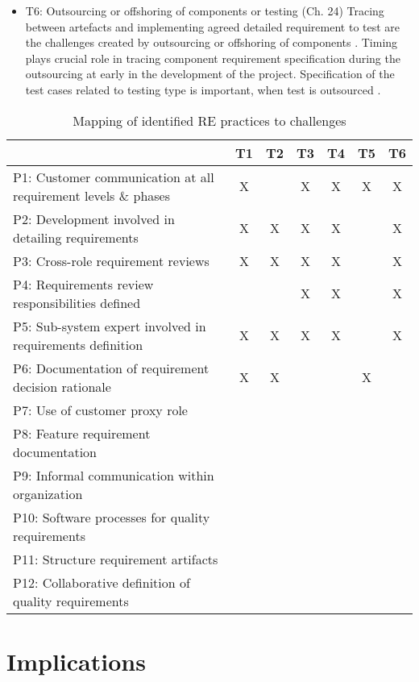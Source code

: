 \documentclass{article}
\begin{document}
\begin{itemize}
\item  T6: Outsourcing or offshoring of components or testing (Ch. 24)
Tracing between artefacts and implementing agreed detailed requirement to test are the challenges created by outsourcing or offshoring of components \cite{bjarnason2014challengesS9}. Timing plays crucial role in tracing component requirement specification during the outsourcing at early in the development of the project. Specification of the test cases related to testing type is important, when test is outsourced \cite{bjarnason2014challengesS9}.

\end{itemize}


\begin{table}[]
    \centering
    \begin{tabular}{p{6cm}|c|c|c|c|c|c}
         &  T1 & T2 & T3 & T4 & T5 & T6 \\
         \hline
        P1: Customer communication at all requirement levels \& phases & X & & X & X & X & X \\
        P2: Development involved in detailing requirements & X & X & X & X & & X \\
        P3: Cross-role requirement reviews & X & X & X & X & & X \\
        P4: Requirements review responsibilities defined  &  &  &  X & X &  &  X \\
        P5: Sub-system expert involved in requirements definition & X & X & X & X &  & X \\
        P6: Documentation of requirement decision rationale & X & X &  &  &  X &   \\
        P7: Use of customer proxy role & & & & & & \\
        P8: Feature requirement documentation & & & & & & \\
        P9: Informal communication within organization & & & & & & \\
        P10: Software processes for quality requirements & & & & & & \\
        P11: Structure requirement artifacts & & & & & & \\
        P12: Collaborative definition of quality requirements & & & & & & \\
        \hline
    \end{tabular}
    \caption{Mapping of identified RE practices to challenges}
    \label{tab:my_label}
\end{table}


\section{Implications}
\end{document}
